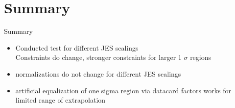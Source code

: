 \section{Summary}
\begin{frame}{Summary}
\begin{itemize}
\item Conducted test for different JES scalings\\
\rar Constraints do change, stronger constraints for larger 1 $\sigma$ regions
\item normalizations do not change for different JES scalings
\item artificial equalization of one sigma region via datacard factors works for limited range of extrapolation
\end{itemize}

\end{frame}
